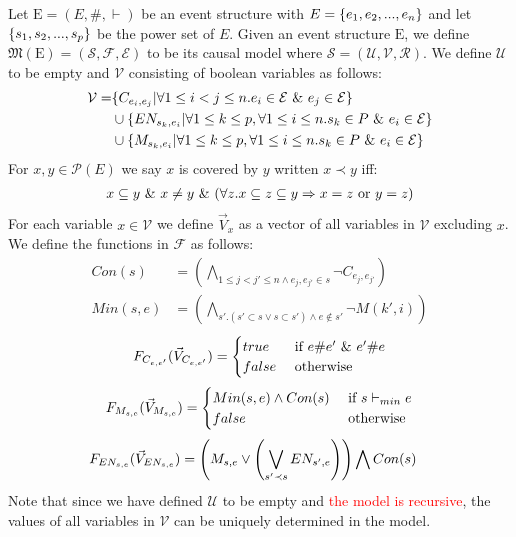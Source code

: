 Let $\mathrm{E} = (E,\#,\vdash)$ be an event structure with
$E = \{e_1, e_2, ...,e_n\}$ and let $\{s_1,s_2,...,s_p\}$ be the power set of $E$.
Given an event structure $\mathrm{E}$, we define
$\mathfrak{M}(\mathrm{E}) = (\mathcal{S},\mathscr{F},\mathcal{E})$
to be its causal model where
$\mathcal{S} = (\mathcal{U},\mathcal{V},\mathcal{R})$.
We define $\mathcal{U}$ to be empty and $\mathcal{V}$ consisting
of boolean variables as follows:
\begin{align*}
    \mathcal{V} = & \{C_{e_i,e_j} | \forall 1 \leq i < j \leq n. e_i \in \mathcal{E} \ \& \  e_j \in \mathcal{E}\}                     \\
                  & \cup \{EN_{s_k,e_i} | \forall 1 \leq k \leq p , \forall 1 \leq i \leq n . s_k \in P \ \& \  e_i \in \mathcal{E} \} \\
                  & \cup \{M_{s_k,e_i} | \forall 1 \leq k \leq p , \forall 1 \leq i \leq n . s_k \in P \ \& \  e_i \in \mathcal{E} \}
\end{align*}
For $x,y \in \mathcal{P}(E)$ we say $x$ is covered by $y$ written $ x \prec y$ iff:
\begin{align*}
    x \subseteq y \ \& \  x \neq y \ \& \ 
    (\forall z. x \subseteq z \subseteq y \Rightarrow x = z
    \text{ or } y = z)
\end{align*}
For each variable $x \in \mathcal{V}$ we define $\vec V_x$ as a vector
of all variables in $\mathcal{V}$ excluding $x$.
We define the functions in $\mathscr{F}$ as follows:
\begin{align*}
    Con(s)   & =   \left(
    \bigwedge_{ 1\leq j<j' \leq n \wedge e_j,e_{j'} \in s}
    \neg C_{e_j,e_{j'}}
    \right)               \\
    Min(s,e) & = \left(
    \bigwedge_{s'. (s' \subset s \vee s \subset s')
        \wedge e \notin s'}
    \neg M(k',i)
    \right)
\end{align*}
$$
    F_{C_{e,e'}}(\vec V_{C_{e,e'}}) = \begin{cases}
        true  & \text{ if } e \# e' \ \& \  e' \# e \\
        false & \text{ otherwise }
    \end{cases}
$$
$$
    F_{M_{s,e}}(\vec V_{M_{s,e}}) = \begin{cases}
        Min(s,e) \wedge Con(s) & \text{ if } s \vdash_{min} e \\
        false                  & \text{ otherwise }
    \end{cases}
$$
\begin{align*}
    F_{EN_{s,e}}(\vec V_{EN_{s,e}}) & =
    \left(
    M_{s,e} \vee
    \left(
    \bigvee_{s'\prec s}EN_{s',e}
    \right)
    \right)
    \bigwedge
    Con(s)
\end{align*}
Note that since we have defined $\mathcal{U}$ to be empty and
\textcolor{red}{the model is recursive}, the values of all variables in
$\mathcal{V}$ can be uniquely determined in the model.

